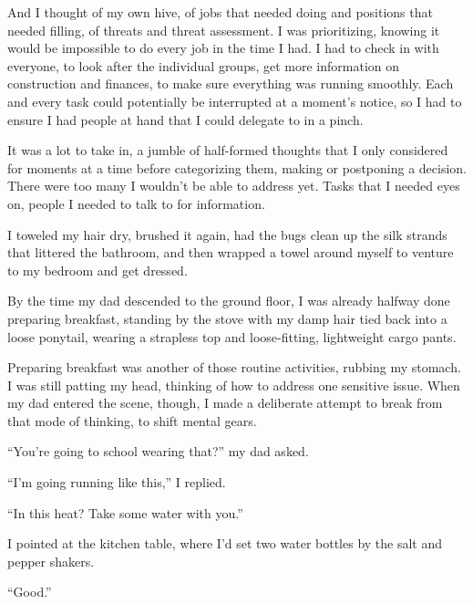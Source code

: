 And I thought of my own hive, of jobs that needed doing and positions that needed filling, of threats and threat assessment.  I was prioritizing, knowing it would be impossible to do every job in the time I had.  I had to check in with everyone, to look after the individual groups, get more information on construction and finances, to make sure everything was running smoothly.  Each and every task could potentially be interrupted at a moment's notice, so I had to ensure I had people at hand that I could delegate to in a pinch.



It was a lot to take in, a jumble of half-formed thoughts that I only considered for moments at a time before categorizing them, making or postponing a decision.  There were too many I wouldn't be able to address yet.  Tasks that I needed eyes on, people I needed to talk to for information.



I toweled my hair dry, brushed it again, had the bugs clean up the silk strands that littered the bathroom, and then wrapped a towel around myself to venture to my bedroom and get dressed.



By the time my dad descended to the ground floor, I was already halfway done preparing breakfast, standing by the stove with my damp hair tied back into a loose ponytail, wearing a strapless top and loose-fitting, lightweight cargo pants.



Preparing breakfast was another of those routine activities, rubbing my stomach.  I was still patting my head, thinking of how to address one sensitive issue.  When my dad entered the scene, though, I made a deliberate attempt to break from that mode of thinking, to shift mental gears.



``You're going to school wearing that?'' my dad asked.



``I'm going running like this,'' I replied.



``In this heat?  Take some water with you.''



I pointed at the kitchen table, where I'd set two water bottles by the salt and pepper shakers.



``Good.''



